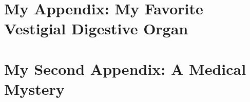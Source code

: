 \documentclass[capstoc,capschap]{rpisudiss}
\begin{document}
\frontmatter

\tableofcontents

\mainmatter %

\appendix

\chapter{My Appendix: My Favorite Vestigial Digestive Organ}
\blindtext

\chapter{My Second Appendix: A Medical Mystery}
\blindtext
\end{document}
